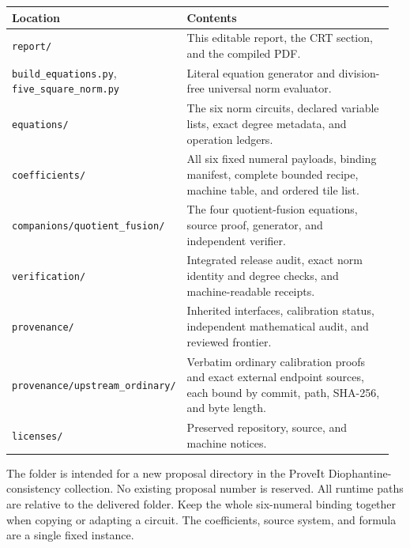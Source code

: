 \documentclass[11pt,a4paper]{article}
\theoremstyle{definition}\newtheorem{definition}[theorem]{Definition}
\theoremstyle{remark}\newtheorem{remark}[theorem]{Remark}
\numberwithin{equation}{section}
\begin{document}
\begin{longtable}{@{}>{\raggedright\arraybackslash}p{0.38\linewidth}>{\raggedright\arraybackslash}p{0.58\linewidth}@{}}
\toprule
Location & Contents\\\midrule
\endhead
\texttt{report/}&
This editable report, the CRT section, and the compiled PDF.\\
\texttt{build\_equations.py},
\texttt{five\_square\_norm.py}&
Literal equation generator and division-free universal norm evaluator.\\
\texttt{equations/}&
The six norm circuits, declared variable lists, exact degree metadata,
and operation ledgers.\\
\texttt{coefficients/}&
All six fixed numeral payloads, binding manifest, complete bounded
recipe, machine table, and ordered tile list.\\
\texttt{companions/quotient\_fusion/}&
The four quotient-fusion equations, source proof, generator, and
independent verifier.\\
\texttt{verification/}&
Integrated release audit, exact norm identity and degree checks,
and machine-readable receipts.\\
\texttt{provenance/}&
Inherited interfaces, calibration status, independent mathematical
audit, and reviewed frontier.\\
\texttt{provenance/upstream\_ordinary/}&
Verbatim ordinary calibration proofs and exact external endpoint
sources, each bound by commit, path, SHA-256, and byte length.\\
\texttt{licenses/}&
Preserved repository, source, and machine notices.\\
\bottomrule
\end{longtable}

The folder is intended for a new proposal directory in the ProveIt
Diophantine-consistency collection. No existing proposal number is
reserved. All runtime paths are relative to the delivered folder.
Keep the whole six-numeral binding together when copying or adapting
a circuit. The coefficients, source system, and formula are a single
fixed instance.
\end{document}
